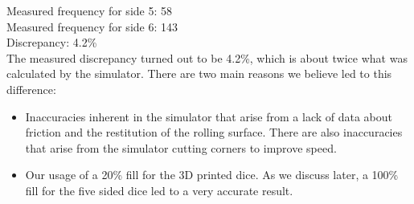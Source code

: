 Measured frequency for side 5: 58\\
Measured frequency for side 6: 143\\
Discrepancy: 4.2\%\\
The measured discrepancy turned out to be 4.2\%, which is about twice what was calculated by the simulator. There are two main reasons we believe led to this difference:\\
\begin{itemize}
    \item Inaccuracies inherent in the simulator that arise from a lack of data about friction and the restitution of the rolling surface. There are also inaccuracies that arise from the simulator cutting corners to improve speed.\\
    \item Our usage of a 20\% fill for the 3D printed dice. As we discuss later, a 100\% fill for the five sided dice led to a very accurate result.
\end{itemize}
